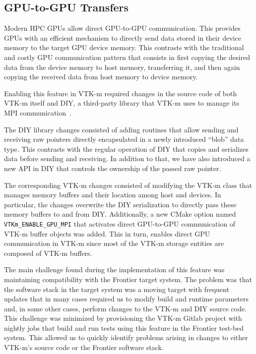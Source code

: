 \subsection{GPU-to-GPU Transfers}

Modern HPC GPUs allow direct GPU-to-GPU communication. This provides GPUs with an efficient mechanism to directly send data stored in their device memory to the target GPU device memory. This contrasts with the traditional and costly GPU communication pattern that consists in first copying the desired data from the device memory to host memory, transferring it, and then again copying the received data from host memory to device memory.

Enabling this feature in VTK-m required changes in the source code of both VTK-m itself and DIY, a third-party library that VTK-m uses to manage its MPI communication~\cite{Peterka2011,Morozov2016}.

The DIY library changes consisted of adding routines that allow sending and receiving raw pointers directly encapsulated in a newly introduced ``blob'' data type. This contrasts with the regular operation of DIY that copies and serializes data before sending and receiving. In addition to that, we have also introduced a new API in DIY that controls the ownership of the passed raw pointer.

The corresponding VTK-m changes consisted of modifying the VTK-m class that manages memory buffers and their location among host and devices.
In particular, the changes overwrite the DIY serialization to directly pass these memory buffers to and from DIY.
Additionally, a new CMake option named \texttt{VTKm\_ENABLE\_GPU\_MPI} that activates direct GPU-to-GPU communication of VTK-m buffer objects was added.
This in turn, enables direct GPU communication in VTK-m since most of the VTK-m storage entities are composed of VTK-m buffers. 

The main challenge found during the implementation of this feature was maintaining compatibility with the Frontier target system.
The problem was that the software stack in the target system was a moving target with frequent updates that in many cases required us to modify build and runtime parameters and, in some other cases, perform changes to the VTK-m and DIY source code.
This challenge was minimized by provisioning the VTK-m Gitlab project with nightly jobs that build and run tests using this feature in the Frontier test-bed system.
This allowed us to quickly identify problems arising in changes to either VTK-m's source code or the Frontier software stack.
